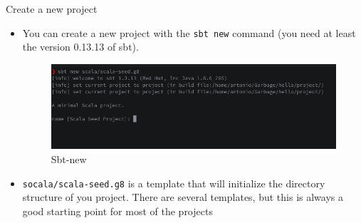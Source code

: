 \documentclass[presentation, aspectratio=169]{beamer}
\begin{document}
\begin{frame}[label={sec:org14d636e},fragile]{Create a new project}
 \begin{itemize}
\item You can create a new project with the \texttt{sbt new} command 
(you need at least the version 0.13.13 of sbt).
\begin{figure}[htbp]
\centering
\includegraphics[width=.9\linewidth]{./img/sbt-new.png}
\caption{\label{fig:org569ce6a}Sbt-new}
\end{figure}

\item \texttt{socala/scala-seed.g8} is a template that will initialize the directory structure of you project.
There are several templates, but this is always a good starting point for most of the projects
\end{itemize}
\end{frame}
\end{document}
